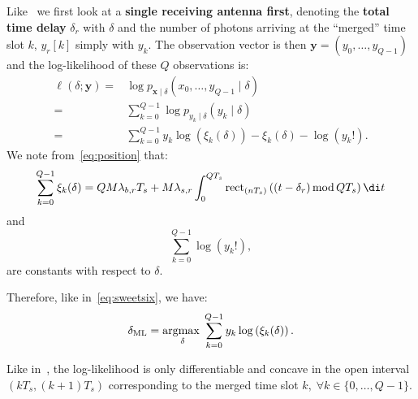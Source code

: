 \noindent
Like~ we first look at a \textbf{single receiving antenna first}, denoting the \textbf{total time delay} \(\delta_r\) with \(\delta\) and the number of photons arriving at the ``merged'' time slot \(k\), \(y_r[k]\) simply with \(y_k\). The observation vector is then \(\mathbf{y}=(y_0,\ldots,y_{Q-1})\) and the log-likelihood of these \(Q\) observations is:
\begin{equation}
\begin{aligned}
\ell(\delta ; \mathbf{y})
= & \log p_{\textbf{x} \mid \delta}\left(x_0, \ldots,y_{Q-1} \mid \delta\right)\\
= & \sum_{k=0}^{Q-1} \log p_{y_k \mid \delta}\left(y_k \mid \delta\right) \\
= & \sum_{k=0}^{Q-1} y_k \log \left( \xi_k(\delta)\right) -\xi_k(\delta)-\log \left(y_{k}!\right).
\end{aligned}
\end{equation}
We note from~\eqref{eq:position} that:
\begin{equation}
\sum_{k=0}^{Q-1}\xi_k(\delta)
=QM\lambda_{b,r} T_s+M\lambda_{s,r} \int_{0}^{QT_s}  \operatorname{rect}_{(nT_s)} \left((t-\delta_r) \,\text{mod}\, QT_s\right) \di t
\end{equation}
and
\begin{equation}
\sum_{k=0}^{Q-1}\log \left(y_{k}!\right),
\end{equation}
are constants with respect to \(\delta\).

\noindent
Therefore, like in~\eqref{eq:sweetsix}, we have:
\begin{equation}
\begin{aligned}
\delta_{\mathrm{ML}} 
=\underset{\delta}{\operatorname*{argmax\;}} 
\sum_{k=0}^{Q-1} y_k \log \left( \xi_k(\delta)\right).
\end{aligned}
\end{equation}

\noindent
Like in~, the log-likelihood is only differentiable and concave in the open interval \((kT_s,(k+1)T_s)\) corresponding to the merged time slot \(k,\;\forall k\in\{0,\ldots,Q-1\}\).

